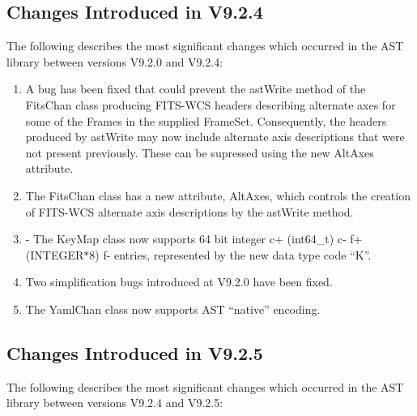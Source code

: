 \documentclass[twoside,11pt]{starlink}
\begin{document}
\subsection{Changes Introduced in V9.2.4}
The following describes the most significant changes which
occurred in the AST library between versions V9.2.0 and V9.2.4:

\begin{enumerate}

\item A bug has been fixed that could prevent the astWrite method of the
FitsChan class producing FITS-WCS headers describing alternate axes for
some of the Frames in the supplied FrameSet.  Consequently, the headers
produced by astWrite may now include alternate axis descriptions that
were not present previously. These can be supressed using the new AltAxes
attribute.
\item The FitsChan class has a new attribute, AltAxes, which controls the
creation of FITS-WCS alternate axis descriptions by the astWrite method.
\item - The KeyMap class now supports 64 bit integer
c+
(int64\_t)
c-
f+
(INTEGER$*$8)
f-
entries, represented by the new data type code ``K''.
\item Two simplification bugs introduced at V9.2.0 have been fixed.
\item The YamlChan class now supports AST ``native'' encoding.
\end{enumerate}


\subsection{Changes Introduced in V9.2.5}
The following describes the most significant changes which
occurred in the AST library between versions V9.2.4 and V9.2.5:
\end{document}
